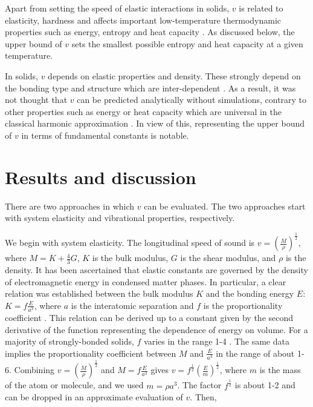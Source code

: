 \documentclass[aps,prl,groupedaddress,fleqn,twocolumn,10pt]{revtex4-1}
\begin{document}
Apart from setting the speed of elastic interactions in solids, $v$ is related to elasticity, hardness and affects important low-temperature thermodynamic properties such as energy, entropy and heat capacity \cite{landau}. As discussed below, the upper bound of $v$ sets the smallest possible entropy and heat capacity at a given temperature.

In solids, $v$ depends on elastic properties and density. These strongly depend on the bonding type and structure which are inter-dependent \cite{phillips}. As a result, it was not thought that $v$ can be predicted analytically without simulations, contrary to other properties such as energy or heat capacity which are universal in the classical harmonic approximation \cite{landau}. In view of this, representing the upper bound of $v$ in terms of fundamental constants is notable.

\section{Results and discussion}

There are two approaches in which $v$ can be evaluated. The two approaches start with system elasticity and vibrational properties, respectively.

We begin with system elasticity. The longitudinal speed of sound is $v=\left({\frac{M}{\rho}}\right)^{\frac{1}{2}}$, where $M=K+\frac{4}{3}G$, $K$ is the bulk modulus, $G$ is the shear modulus, and $\rho$ is the density. It has been ascertained that elastic constants are governed by the density of electromagnetic energy in condensed matter phases. In particular, a clear relation was established between the bulk modulus $K$ and the bonding energy $E$: $K=f\frac{E}{a^3}$, where $a$ is the interatomic separation and $f$ is the proportionality coefficient \cite{diamond,diamond1}. This relation can be derived up to a constant given by the second derivative of the function representing the dependence of energy on volume. For a majority of strongly-bonded solids, $f$ varies in the range 1-4 \cite{diamond,diamond1}. The same data implies the proportionality coefficient between $M$ and $\frac{E}{a^3}$ in the range of about 1-6. Combining $v=\left({\frac{M}{\rho}}\right)^{\frac{1}{2}}$ and $M=f\frac{E}{a^3}$ gives $v=f^{\frac{1}{2}}\left(\frac{E}{m}\right)^{\frac{1}{2}}$, where $m$ is the mass of the atom or molecule, and we used $m=\rho a^3$. The factor $f^{\frac{1}{2}}$ is about 1-2 and can be dropped in an approximate evaluation of $v$. Then,
\end{document}
